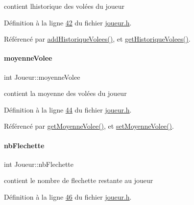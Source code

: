 contient l\textquotesingle{}historique des volées du joueur 



Définition à la ligne \hyperlink{joueur_8h_source_l00042}{42} du fichier \hyperlink{joueur_8h_source}{joueur.\+h}.



Référencé par \hyperlink{joueur_8cpp_source_l00168}{add\+Historique\+Volees()}, et \hyperlink{joueur_8cpp_source_l00090}{get\+Historique\+Volees()}.

\mbox{\label{class_joueur_ac5641a2a8fc1deebe5bba27bf21eb446}} 
\paragraph{\texorpdfstring{moyenne\+Volee}{moyenneVolee}}
{\footnotesize\ttfamily int Joueur\+::moyenne\+Volee\hspace{0.3cm}{\ttfamily [private]}}



contient la moyenne des volées du joueur 



Définition à la ligne \hyperlink{joueur_8h_source_l00044}{44} du fichier \hyperlink{joueur_8h_source}{joueur.\+h}.



Référencé par \hyperlink{joueur_8cpp_source_l00079}{get\+Moyenne\+Volee()}, et \hyperlink{joueur_8cpp_source_l00123}{set\+Moyenne\+Volee()}.

\mbox{\label{class_joueur_a330099a1952fbf97b2faea2c640b32f5}} 
\paragraph{\texorpdfstring{nb\+Flechette}{nbFlechette}}
{\footnotesize\ttfamily int Joueur\+::nb\+Flechette\hspace{0.3cm}{\ttfamily [private]}}



contient le nombre de flechette restante au joueur 



Définition à la ligne \hyperlink{joueur_8h_source_l00046}{46} du fichier \hyperlink{joueur_8h_source}{joueur.\+h}.



